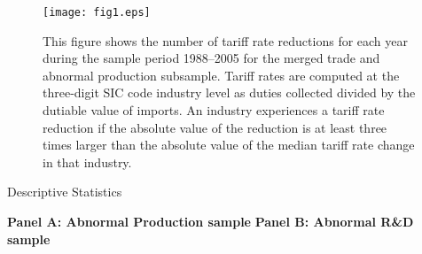 \documentclass[notitlepage, 12pt]{article}
\makeatletter
\let\estinput=%
\newcommand{\estwide}[3]{
		\vspace{.75ex}{
			\begin{tabular*}
			{\textwidth}{@{\hskip\tabcolsep\extracolsep\fill}l*{#2}{#3}}
			\toprule
			\estinput{#1}
			\bottomrule
			\addlinespace[.75ex]
			\end{tabular*}
			}
		}
\newcommand{\estauto}[3]{
		\vspace{.75ex}{
			\begin{tabular}{l*{#2}{#3}}
			\toprule
			\estinput{#1}
			\bottomrule
			\addlinespace[.75ex]
			\end{tabular}
			}
		}
\newcommand{\figtext}[1]{
	\captionsetup{justification=justified,font=footnotesize}
	\caption*{\hspace{6pt}\hangindent=1.5em #1}
	}
\newcommand{\fignote}[1]{\figtext{\emph{Note:~}~#1}}
\newcommand{\starnote}{\figtext{* $p < 0.1$, ** $p < 0.05$, *** $p < 0.01$. Standard errors in parentheses.}}
\makeatother
\begin{document}


\newpage
\begin{figure}[htbp]
	\centering
		\texttt{[image: fig1.eps]}
	\caption{This figure shows the number of tariff rate reductions for each year during the sample period 1988--2005 for the merged trade and abnormal production subsample. Tariff rates are computed at the three-digit SIC code industry level as duties collected divided by the dutiable value of imports. An industry experiences a tariff rate reduction if the absolute value of the reduction is at least three times larger than the absolute value of the median tariff rate change in that industry.}
	\label{fig:distribution}
\end{figure}

\begin{table}\centering
\caption{Descriptive Statistics}
\textbf{Panel A: Abnormal Production sample}
\textbf{Panel B: Abnormal R\&D sample}
\label{table:descriptivesrd}
\end{table}

%
\begin{comment}
\begin{table}
\caption{The relationship between real activities manipulation and firms' just meeting zero earnings or last year's earnings}\centering
\estauto{csrprod2}{2}{c}
\starnote
\fignote{In both panels, column 1 presents coefficient estimates of OLS regressions which compare firm-years that just met zero earnings or last year's earnings with other firm-years, and column 2 contains firm and year fixed effects such that the comparison is within-firms. The sample period is from 1988 to 2005. All variables are defined in the text. Standard errors are clustered by firm.}
\label{table:csrprod}
\end{table}
\end{comment}
%
\end{document}
